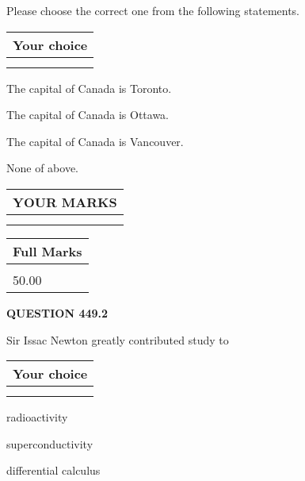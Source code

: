 \documentclass[12pt]{article}
\begin{document}
  
Please choose the correct one from the following statements.
  
  
\noindent\hspace{3.0in} \begin{tabular}{|l|}
\hline
Your choice \\
\hline
 \\ 
 \\ 
\hline
\end{tabular}
  
  
 
 
The capital of Canada is Toronto.
 
 
The capital of Canada is Ottawa.
 
 
The capital of Canada is Vancouver.
 
 
 None of above.
 
 
  
\vspace{0.2in}
  
\noindent\begin{tabular}{|l|}
\hline
 YOUR MARKS  \\
\hline
 \\ 
 \\ 
\hline
\end{tabular}
\hspace{0.05in} \begin{tabular}{|l|}
\hline
 Full Marks  \\
\hline
 \\ 
50.00 \\
\hline
\end{tabular}
{\textbf{\Large{QUESTION
449.2 
}}}
  
  
Sir Issac Newton greatly contributed study to
  
  
\noindent\hspace{3.0in} \begin{tabular}{|l|}
\hline
Your choice \\
\hline
 \\ 
 \\ 
\hline
\end{tabular}
  
  
 
 
radioactivity
 
 
superconductivity
 
 
differential calculus
 
\end{document}
